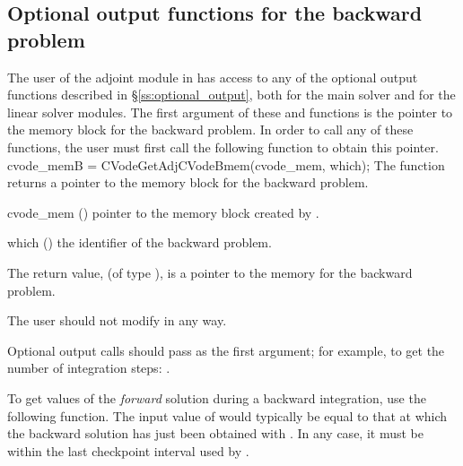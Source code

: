 \subsection{Optional output functions for the backward problem}\label{ss:optional_output_b}
The user of the adjoint module in {\cvodes} has access to any of the optional
output functions described in \S\ref{ss:optional_output}, both for the main solver
and for the linear solver modules. The first argument of these  and
 functions is the pointer to the {\cvodes} memory block for the
backward problem. In order to call any of these functions, the user must first 
call the following function to obtain this pointer.
{
  cvode\_memB = CVodeGetAdjCVodeBmem(cvode\_mem, which);
}
{
  The function  returns a pointer to the {\cvodes}
  memory block for the backward problem.
}
{
  \begin{args}
  \item[cvode\_mem] ()
    pointer to the {\cvodes} memory block created by .
  \item[which] ()
    the identifier of the backward problem.
  \end{args}
}
{
  The return value,  (of type ), is a pointer to the
  {\cvodes} memory for the backward problem.
}
{
  {\warn}The user should not modify  in any way.

  Optional output calls should pass  as the first argument;
  for example, to get the number of integration steps:
  .
}

To get values of the {\it forward} solution during a backward integration,
use the following function.  The input value of  would typically be
equal to that at which the backward solution has just been obtained with
.  In any case, it must be within the last checkpoint interval
used by .

